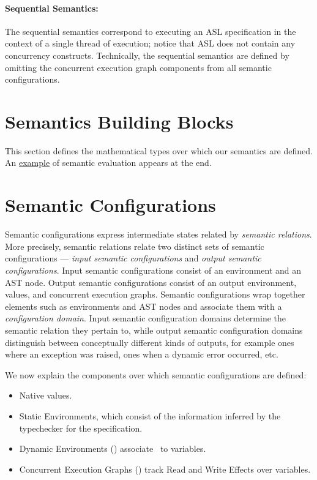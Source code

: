 \paragraph{Sequential Semantics:}
The sequential semantics correspond to executing an ASL specification in the context of a single thread
of execution; notice that ASL does not contain any concurrency constructs.
%
Technically, the sequential semantics are defined by omitting the concurrent execution graph components
from all semantic configurations.

\section{Semantics Building Blocks}
\label{sec:semanticsbuildingblocks}
This section defines the mathematical types over which our semantics are defined.
An \hyperlink{eval-example}{example} of semantic evaluation appears at the end.

\section{Semantic Configurations\label{sec:SemanticConfigurations}}

Semantic configurations express intermediate states related by \emph{semantic relations}.
%
More precisely, semantic relations relate two distinct sets of semantic configurations ---
\emph{input semantic configurations} and \emph{output semantic configurations}.
Input semantic configurations consist of an environment and an AST node.
Output semantic configurations consist of an output environment, values,
and concurrent execution graphs.
%
Semantic configurations wrap together elements such as environments and AST nodes
and associate them with a \emph{configuration domain}. Input semantic configuration domains
determine the semantic relation they pertain to, while output semantic configuration
domains distinguish between conceptually different kinds of outputs, for example
ones where an exception was raised, ones when a dynamic error occurred, etc.

We now explain the components over which semantic configurations are defined:
\begin{itemize}
    \item Native values.
    \item Static Environments, which consist of the information inferred
            by the typechecker for the specification.
    \item Dynamic Environments () associate \nativevalues\ to variables.
    \item Concurrent Execution Graphs () track Read and Write Effects over variables.
\end{itemize}

